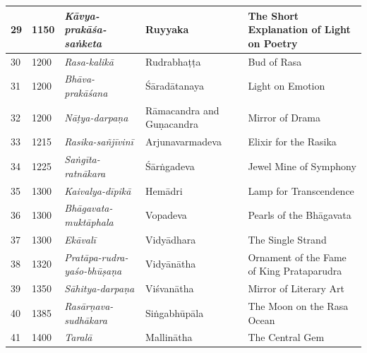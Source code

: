 \begin{longtable}{|l|p{1.1cm}|p{1.98cm}|p{1.98cm}|p{1.98cm}|}
\hline
29 & 1150 & \textit{Kāvya-prakāśa-saṅketa}\index{Kavyaprakasasanketa@\textit{Kāvya-prakāśa-saṅketa}} & Ruyyaka & The Short Explanation of Light on Poetry \\
\hline
30 & 1200 & \textit{Rasa-kalikā}\index{Rasakalika@\textit{Rasa-kalikā}} & Rudrabhaṭṭa\index{Rudrabhatta@Rudrabhaṭṭa} & Bud of Rasa\index{rasa@\textit{rasa}} \\
\hline
31 & 1200 & \textit{Bhāva-prakāśana}\index{Bhavaprakasana@\textit{Bhāva-prakāśana}} & Śāradātanaya\index{Saradatanaya@Śaradā-tanaya} & Light on Emotion \\
\hline
32 & 1200 & \textit{Nāṭya-darpaṇa}\index{Natyadarpana@\textit{Nāṭya-darpaṇa}} & Rāmacandra\index{Ramacandra@Rāmacandra} and Guṇacandra\index{Gunacandra@Guṇacandra} & Mirror of Drama \\
\hline
33 & 1215 & \textit{Rasika-sañjīvinī}\index{Rasikasanjivini@\textit{Rasika-sañjīvinī}} & Arjunavarma\-deva\index{Arjunavarmadeva} & Elixir for the Rasika\index{rasika@\textit{rasika}} \\
\hline
34 & 1225 & \textit{Saṅgīta-ratnākara}\index{Sangitaratnakara@\textit{Saṅgīta-ratnākara}} & Śārṅgadeva\index{Sarngadeva@Śārṅgadeva} & Jewel Mine of Symphony \\
\hline
35 & 1300 & \textit{Kaivalya-dīpikā}\index{Kaivalyadipika@\textit{Kaivalya-dīpikā}} & Hemādri\index{Hemadri@Hemādri} & Lamp for Transcendence \\
\hline
36 & 1300 & \textit{Bhāgavata-muktāphala}\index{Bhagavatamuktaphala@\textit{Bhāgavata-muktāphala}} & Vopadeva & Pearls of the Bhāgavata \\
\hline
37 & 1300 & \textit{Ekāvalī}\index{Ekavali@\textit{Ekāvalī}} & Vidyādhara & The Single Strand \\
\hline
38 & 1320 & \textit{Pratāpa-rudra-yaśo-bhūṣaṇa}\index{Prataparudrayasobhusana@\textit{Pratāparudra-yaśobhūṣaṇa}} & Vidyānātha & Ornament of the Fame of King Prataparudra \\
\hline
39 & 1350 & \textit{Sāhitya-darpaṇa}\index{Sahityadarpana@\textit{Sāhitya-darpaṇa}} & Viśvanātha & Mirror of Literary Art \\
\hline
40 & 1385 & \textit{Rasārṇava-sudhākara}\index{Rasarnavasudhakara@\textit{Rasārṇava-sudhākara}} & Siṅgabhūpāla\index{Singabhupala@Siṅgabhūpāla} & The Moon on the Rasa\index{rasa@\textit{rasa}} Ocean \\
\hline
41 & 1400 & \textit{Taralā}\index{Tarala@\textit{Taralā}} & Mallinātha\index{Mallinatha@Mallinātha} & The Central Gem \\

\end{longtable}
